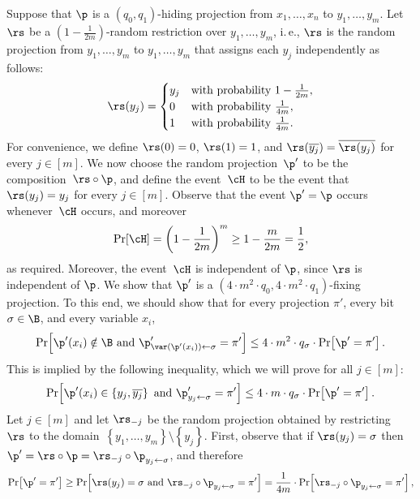 \documentclass[11pt]{article}
\numberwithin{equation}{section}
\theoremstyle{definition}
\theoremstyle{plain}
\newcommand{\ie}{i.\,e.}
\theoremstyle{definition}\newtheorem{notation}[theorem]{Notation}\theoremstyle{plain}
\begin{document}
Suppose that $\p$ is a $(q_{0},q_{1})$-hiding projection from $x_{1},\ldots,x_{n}$
to $y_{1},\ldots,y_{m}$. Let $\rs$ be a $\left(1-\frac{1}{2m}\right)$-random
restriction over $y_{1},\ldots,y_{m}$, \ie, $\rs$ is the random
projection from $y_{1},\ldots,y_{m}$ to $y_{1},\ldots,y_{m}$ that
assigns each $y_{j}$ independently as follows: 
\[
\rs(y_{j})=\begin{cases}
y_{j} & \text{with probability \ensuremath{1-\frac{1}{2m}}},\\
0 & \text{with probability \ensuremath{\frac{1}{4m}}},\\
1 & \text{with probability \ensuremath{\frac{1}{4m}}}.
\end{cases}
\]
For convenience, we define $\rs(0)=0$, $\rs(1)=1$, and $\rs(\overline{y_{j}})=\overline{\rs(y_{j})}$
for every $j\in\left[m\right]$. We now choose the random projection~$\p'$
to be the composition~$\rs\circ\p$, and define the event~$\cH$
to be the event that $\rs(y_{j})=y_{j}$ for every $j\in\left[m\right]$.
Observe that the event $\p'=\p$ occurs whenever~$\cH$ occurs, and
moreover 
\[
\Pr\!\left[\cH\right]=\left(1-\frac{1}{2m}\right)^{m}\ge1-\frac{m}{2m}=\frac{1}{2},
\]
as required. Moreover, the event~$\cH$ is independent of $\p$,
since $\rs$ is independent of $\p$. We show that $\p'$ is a $(4\cdot m^{2}\cdot q_{0},4\cdot m^{2}\cdot q_{1})$-fixing
projection. To this end, we should show that for every projection
$\pi'$, every bit $\sigma\in\B$, and every variable $x_{i}$, 
\begin{equation}
\Pr\!\left[\p'(x_{i})\notin\B\text{ and }\p_{\var(\p'(x_{i}))\gets\sigma}'=\pi'\right]\leq4\cdot m^{2}\cdot q_{\sigma}\cdot\Pr\!\left[\p'=\pi'\right].\label{eq:shrinkage-hiding-goal-after-summation}
\end{equation}
This is implied by the following inequality, which we will prove for
all $j\in\left[m\right]$: 
\begin{equation}
\Pr\!\left[\p'(x_{i})\in\left\{ y_{j},\overline{y_{j}}\right\} \text{ and }\p_{y_{j}\gets\sigma}'=\pi'\right]\leq4\cdot m\cdot q_{\sigma}\cdot\Pr\!\left[\p'=\pi'\right].\label{eq:shrinkage-hiding-goal}
\end{equation}
Let $j\in\left[m\right]$ and let $\rs_{-j}$ be the random projection
obtained by restricting~$\rs$ to the domain~$\left\{ y_{1},\ldots,y_{m}\right\} \setminus\left\{ y_{j}\right\} $.
First, observe that if $\rs(y_{j})=\sigma$ then $\p'=\rs\circ\p=\rs_{-j}\circ\p_{y_{j}\gets\sigma}$,
and therefore 
\[
\Pr\!\left[\p'=\pi'\right]\geq\Pr\!\left[\rs(y_{j})=\sigma\text{ and }\rs_{-j}\circ\p_{y_{j}\gets\sigma}=\pi'\right]=\frac{1}{4m}\cdot\Pr\!\left[\rs_{-j}\circ\p_{y_{j}\gets\sigma}=\pi'\right],
\]
\end{document}
